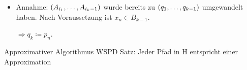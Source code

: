 \documentclass{beamer}
\begin{document}
	\begin{frame}
		\begin{itemize}
			\item Annahme: $(A_{i_1}, \mathellipsis, A_{i_k-1})$ wurde bereits zu $(q_1, \mathellipsis, q_{k-1})$ umgewandelt haben. 
			Nach Voraussetzung ist $x_n \in B_{k-1}$. 
			
			$\Rightarrow q_k \coloneqq p_n$. 
		\end{itemize}
	\end{frame}
	
	
	\begin{frame}{Approximativer Algorithmus WSPD}
		Satz: Jeder Pfad in H entspricht einer Approximation
	\end{frame}
\end{document}
